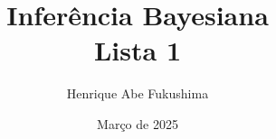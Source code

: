 \documentclass[a4paper,12pt]{article}
\title{Inferência Bayesiana\\Lista 1}
\author{Henrique  Abe Fukushima}
\date{Março de 2025}
\begin{document}
\maketitle
\tableofcontents
\pagebreak

\end{document}
